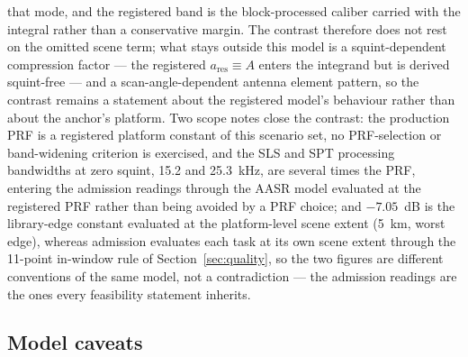 \documentclass[preprint,authoryear]{elsarticle}
\begin{document}
that mode, and the registered band is the block-processed caliber carried with the integral rather than a conservative margin. The contrast therefore does not rest on the omitted scene term; what stays outside this model is a squint-dependent compression factor --- the registered $a_{\mathrm{res}}\equiv A$ enters the integrand but is derived squint-free --- and a scan-angle-dependent antenna element pattern, so the contrast remains a statement about the registered model's behaviour rather than about the anchor's platform. Two scope notes close the contrast: the production PRF is a registered platform constant of this scenario set, no PRF-selection or band-widening criterion is exercised, and the SLS and SPT processing bandwidths at zero squint, 15.2 and 25.3~kHz, are several times the PRF, entering the admission readings through the AASR model evaluated at the registered PRF rather than being avoided by a PRF choice; and $-7.05$~dB is the library-edge constant evaluated at the platform-level scene extent (5~km, worst edge), whereas admission evaluates each task at its own scene extent through the 11-point in-window rule of Section~\ref{sec:quality}, so the two figures are different conventions of the same model, not a contradiction --- the admission readings are the ones every feasibility statement inherits.

\subsection{Model caveats}\label{sec:caveats}
\end{document}
